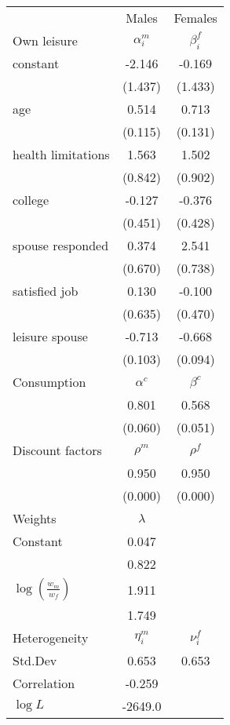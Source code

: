\begin{tabular}{lcc} 
\hline\hline 
 & Males & Females \\ 
Own leisure & $\alpha_{i}^{m}$ & $\beta_{i}^{f}$ \\ 
constant & -2.146 & -0.169 \\ 
 & (1.437) & (1.433) \\ 
age & 0.514 & 0.713 \\ 
 & (0.115) & (0.131) \\ 
health limitations & 1.563 & 1.502 \\ 
 & (0.842) & (0.902) \\ 
college & -0.127 & -0.376 \\ 
 & (0.451) & (0.428) \\ 
spouse responded & 0.374 & 2.541 \\ 
 & (0.670) & (0.738) \\ 
satisfied job & 0.130 & -0.100 \\ 
 & (0.635) & (0.470) \\ 
leisure spouse & -0.713 & -0.668 \\ 
 & (0.103) & (0.094) \\ 
Consumption & $\alpha^{c}$ & $\beta^{c}$ \\ 
 & 0.801 & 0.568 \\ 
 & (0.060) & (0.051) \\ 
Discount factors & $\rho^m$ & $\rho^f$ \\ 
 & 0.950 & 0.950 \\ 
 & (0.000) & (0.000) \\ 
Weights & $\lambda$ &  \\ 
Constant & 0.047 &  \\ 
 & 0.822 &  \\ 
$\log(\frac{w_m}{w_f})$ & 1.911 &  \\ 
 & 1.749 &  \\ 
Heterogeneity & $\eta_i^m$ & $\nu_i^f$ \\ 
Std.Dev & 0.653 & 0.653 \\ 
Correlation & -0.259 &  \\ 
\hline 
$\log L$ & -2649.0 & \\ 
\hline \hline 
\end{tabular} 
